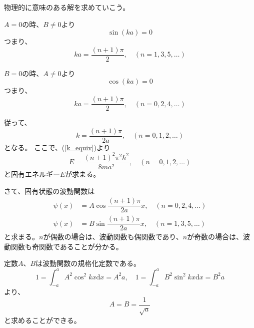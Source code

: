 物理的に意味のある解を求めていこう。

$A = 0$の時、$B \neq 0$より
\begin{equation}
  \sin(ka) = 0
\end{equation}
つまり、
\begin{equation}
  ka = \dfrac{(n+1)\pi}{2}, \quad(n = 1, 3, 5, \ldots)
\end{equation}

$B = 0$の時、$A \neq 0$より
\begin{equation}
  \cos(ka) = 0
\end{equation}
つまり、
\begin{equation}
  ka = \dfrac{(n+1)\pi}{2}, \quad(n = 0, 2, 4, \ldots)
\end{equation}

従って、
\begin{equation}
  k = \dfrac{(n+1)\pi}{2a}, \quad(n = 0, 1, 2, \ldots)
\end{equation}
となる。
ここで、(\ref{k_equiv})より
\begin{equation}
  E = \dfrac{(n+1)^2\pi^2\hbar^2}{8ma^2}, \quad(n = 0,1,2,\ldots)
\end{equation}
と固有エネルギー$E$が求まる。

さて、固有状態の波動関数は
\begin{align}
  \psi(x) &= A\cos{\dfrac{(n+1)\pi}{2a}x}, \quad(n = 0, 2, 4, \ldots) \\
  \psi(x) &= B\sin{\dfrac{(n+1)\pi}{2a}x}, \quad(n = 1, 3, 5, \ldots)
\end{align}
と求まる。$n$が偶数の場合は、波動関数も偶関数であり、$n$が奇数の場合は、波動関数も奇関数であることが分かる。

定数$A$、$B$は波動関数の規格化定数である。
\begin{equation}
  1=\int_{-a}^{a} A^{2} \cos ^{2} k x \mathrm{d} x=A^{2} a, \quad
  1=\int_{-a}^{a} B^{2} \sin ^{2} k x \mathrm{d} x=B^{2} a
\end{equation}
より、
\begin{equation}
  A = B = \dfrac{1}{\sqrt{a}}
\end{equation}
と求めることができる。
